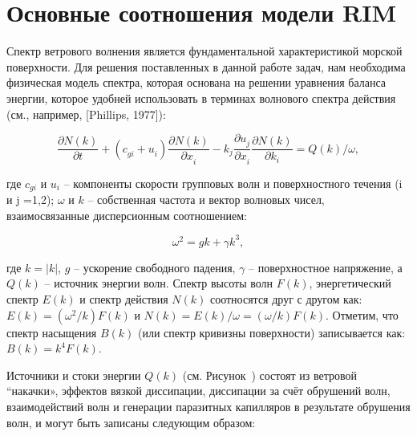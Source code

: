 \appendix



\chapter{Основные соотношения модели RIM} \label{AppendixA}




Спектр ветрового волнения является фундаментальной характеристикой морской поверхности. Для решения поставленных в данной работе задач, нам необходима физическая модель спектра, которая основана на решении уравнения баланса энергии, которое удобней использовать в терминах волнового спектра действия (см., например, [Phillips, 1977]):



\begin{equation} \label{1.29)} \frac{\partial N(k)}{\partial t} +\left(c_{gi}^{} +u_{i}^{} \right)\frac{\partial N(k)}{\partial x_{i}^{} } -k_{j}^{} \frac{\partial u_{j}^{} }{\partial x_{i}^{} } \frac{\partial N(k)}{\partial k_{i}^{} } =Q(k)/\omega , \end{equation} 



\noindent где $c_{gi} $ и $u_{i} $ -- компоненты скорости групповых волн и поверхностного течения (i и j =1,2); $\omega $ и $k$ -- собственная частота и вектор волновых чисел, взаимосвязанные дисперсионным соотношением:



\begin{equation} \label{1.30)} \omega _{}^{2} =gk+\gamma k_{}^{3} , \end{equation} 



\noindent где $k=|k|$, $g$ -- ускорение свободного падения, $\gamma $ -- поверхностное напряжение, а $Q(k)$ -- источник энергии волн. Спектр высоты волн $F(k)$, энергетический спектр $E(k)$ и спектр действия $N(k)$ соотносятся друг с другом как: $E(k)=(\omega ^{2} /k)F(k)$ и $N(k)=E(k)/\omega =(\omega /k)F(k)$. Отметим, что спектр насыщения $B(k)$ (или спектр кривизны поверхности) записывается как: $B(k)=k^{4} F(k)$.

Источники и стоки энергии $Q(k)$ (см. Рисунок~) состоят из ветровой ``накачки», эффектов вязкой диссипации, диссипации за счёт обрушений волн, взаимодействий волн и генерации паразитных капилляров в результате обрушения волн, и могут быть записаны следующим образом:



